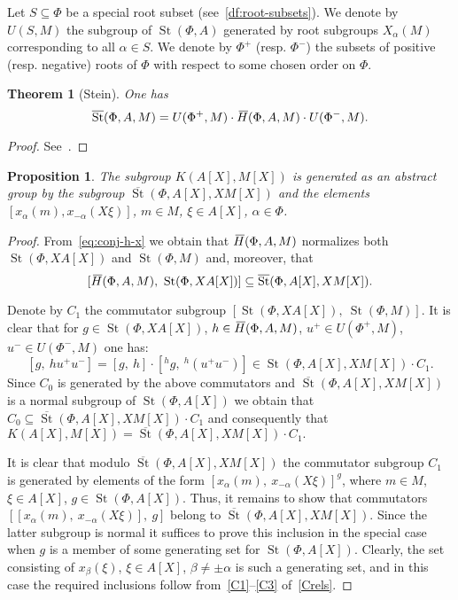 \documentclass[10pt,a4paper,twoside]{article}
\newtheorem{prop}[lemma]{Proposition}
\newtheorem{externaltheorem}[lemma]{Theorem}
\theoremstyle{remark}
\theoremstyle{definition}
\numberwithin{lemma}{section}
\numberwithin{prop}{section}
\numberwithin{corollary}{section}
\numberwithin{externaltheorem}{section}
\DeclareMathOperator{\St}{St}
\newcommand{\myol}[2][3]{{}\mkern#1mu\overline{\mkern-#1mu#2}}
\numberwithin{equation}{section}
\begin{document}
Let $S \subseteq \Phi$ be a special root subset (see~\cref{df:root-subsets}). We denote by $U(S, M)$ the subgroup of $\St(\Phi, A)$ generated by root subgroups $X_\alpha(M)$ corresponding to all $\alpha \in S$. We denote by $\Phi^+$ (resp. $\Phi^-$) the subsets of positive (resp. negative) roots of $\Phi$ with respect to some chosen order on $\Phi$.
 
\begin{externaltheorem}[Stein] \label{thm:Stein} One has \[\overline{\St}(\Phi, A, M) = U(\Phi^+, M) \cdot \myol{H}(\Phi, A, M) \cdot U(\Phi^-, M).\] \end{externaltheorem} \begin{proof} See~\cite[Theorem~2.4]{Ste73}. \end{proof}

\begin{prop} \label{Kgen} The subgroup $K(A[X], M[X])$ is generated as an abstract group by the subgroup $\overline{\St}(\Phi, A[X], XM[X])$ and
 the elements $[x_\alpha(m), x_{-\alpha}(X\xi)]$, $m \in M$, $\xi \in A[X]$, $\alpha \in \Phi$. \end{prop}
\begin{proof} From~\eqref{eq:conj-h-x} we obtain that $\myol{H}(\Phi, A, M)$ normalizes both $\St(\Phi, XA[X])$ and $\St(\Phi, M)$ and, moreover, that \[[\myol{H}(\Phi, A, M),\ \St(\Phi, XA[X])] \subseteq \overline{\St}(\Phi, A[X], XM[X]).\]

Denote by $C_1$ the commutator subgroup $[\St(\Phi, XA[X]),\ \St(\Phi, M)]$.
It is clear that for $g \in \St(\Phi, XA[X])$, $h \in \myol{H}(\Phi, A, M)$, $u^+ \in U(\Phi^+, M)$, $u^- \in U(\Phi^-, M)$ one has:
\[ [g,\ h u^+ u^-] = [g,\ h] \cdot [{}^{h}\!g,\ {}^{h}\!(u^+u^-)] \in \St(\Phi, A[X], XM[X]) \cdot C_1.\]
Since $C_0$ is generated by the above commutators and $\overline{\St}(\Phi, A[X], XM[X])$ is a normal subgroup of $\St(\Phi, A[X])$
we obtain that $C_0 \subseteq \overline{\St}(\Phi, A[X], XM[X]) \cdot C_1$ and consequently that
$K(A[X], M[X]) = \overline{\St}(\Phi, A[X], XM[X]) \cdot C_1.$
 
It is clear that modulo $\overline{\St}(\Phi, A[X], XM[X])$ the commutator subgroup $C_1$ is generated by elements of the form $[x_\alpha(m),\ x_{-\alpha}(X\xi)]^g$, where $m \in M$, $\xi \in A[X]$, $g \in \St(\Phi, A[X])$.
Thus, it remains to show that commutators $[[x_\alpha(m),\ x_{-\alpha}(X\xi)],\ g]$ belong to $\overline{\St}(\Phi, A[X], XM[X])$.
Since the latter subgroup is normal it suffices to prove this inclusion in the special case when $g$ is a member of some generating set for $\St(\Phi, A[X])$.
Clearly, the set consisting of $x_\beta(\xi)$, $\xi \in A[X]$, $\beta \neq \pm \alpha$ is such a generating set, 
 and in this case the required inclusions follow from~\ref{C1}--\ref{C3} of~\cref{Crels}. \end{proof}
\end{document}
